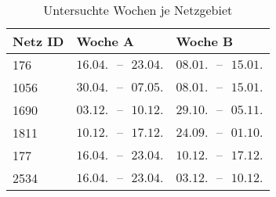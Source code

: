 {
\renewcommand{\arraystretch}{1.2}%
\begin{table}[H]
	\begin{center}
		\caption{Untersuchte Wochen je Netzgebiet}
		\begin{tabu} to 0.6\textwidth {X[0.5] X[1, r] X[1, r]}
			\toprule
			Netz ID	   & Woche A                         & Woche B                         \\ \midrule
			\num{176}  & \(16.04. \text{ {--} } 23.04.\) & \(08.01. \text{ {--} } 15.01.\) \\
			\num{1056} & \(30.04. \text{ {--} } 07.05.\) & \(08.01. \text{ {--} } 15.01.\) \\
			\num{1690} & \(03.12. \text{ {--} } 10.12.\) & \(29.10. \text{ {--} } 05.11.\) \\
			\num{1811} & \(10.12. \text{ {--} } 17.12.\) & \(24.09. \text{ {--} } 01.10.\) \\
			\num{177}  & \(16.04. \text{ {--} } 23.04.\) & \(10.12. \text{ {--} } 17.12.\) \\
			\num{2534} & \(16.04. \text{ {--} } 23.04.\) & \(03.12. \text{ {--} } 10.12.\) \\ \bottomrule
		\end{tabu}
		\label{tab:extreme_weeks}
	\end{center}
	\vspace{-3mm}%
\end{table}
}